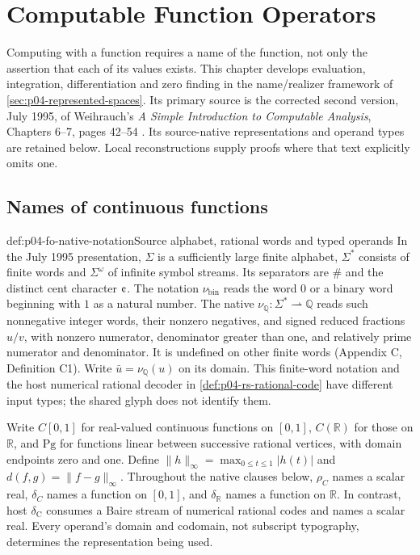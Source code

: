 \chapter{Computable Function Operators}
\label{sec:p04-function-operators}

Computing with a function requires a name of the function, not
only the assertion that each of its values exists.
This chapter develops evaluation, integration, differentiation and
zero finding in the name/realizer framework of
\cref{sec:p04-represented-spaces}.
Its primary source is the corrected second version, July 1995,
of Weihrauch's \emph{A Simple Introduction to Computable Analysis},
Chapters 6--7, pages 42--54 \cite{Weihrauch1995IntroductionRS}.
Its source-native representations and operand types are retained
below. Local reconstructions supply proofs where that text
explicitly omits one.

\section{Names of continuous functions}
\label{sec:p04-fo-names}

\begin{hbconvention}{def:p04-fo-native-notation}{Source alphabet, rational words and typed operands}
In the July 1995 presentation, \(\Sigma\) is a sufficiently
large finite alphabet, \(\Sigma^*\) consists of finite words
and \(\Sigma^\omega\) of infinite symbol streams.
Its separators are \(\#\) and the distinct cent character
\(\text{\textcent}\).
The notation \(\nu_{\mathrm{bin}}\) reads the word \(0\)
or a binary word beginning with \(1\) as a natural number.
The native \(\nu_{\mathbb Q}:\Sigma^*\rightharpoonup\mathbb Q\)
reads such nonnegative integer words, their nonzero negatives,
and signed reduced fractions \(u/v\), with nonzero numerator,
denominator greater than one, and relatively prime numerator
and denominator. It is undefined on other finite words
(Appendix C, Definition C1).
Write \(\bar u=\nu_{\mathbb Q}(u)\) on its domain.
This finite-word notation and the host numerical rational
decoder in \cref{def:p04-rs-rational-code} have different
input types; the shared glyph does not identify them.

Write \(C[0,1]\) for real-valued continuous functions on
\([0,1]\), \(C(\mathbb R)\) for those on \(\mathbb R\), and
\(\mathrm{Pg}\) for functions linear between successive
rational vertices, with domain endpoints zero and one.
Define \(\lVert h\rVert_\infty
=\max_{0\leq t\leq1}|h(t)|\) and
\(d(f,g)=\lVert f-g\rVert_\infty\).
Throughout the native clauses below, \(\rho_C\) names a
scalar real, \(\delta_C\) names a function on \([0,1]\),
and \(\delta_{\mathbb R}\) names a function on \(\mathbb R\).
In contrast, host \(\delta_{\mathrm C}\) consumes a Baire
stream of numerical rational codes and names a scalar real.
Every operand's domain and codomain, not subscript typography,
determines the representation being used.
\end{hbconvention}

